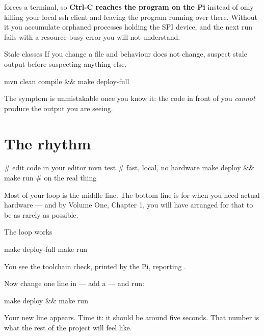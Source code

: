  forces a terminal, so \textbf{Ctrl-C reaches the program on the Pi}
instead of only killing your local ssh client and leaving the program running
over there. Without it you accumulate orphaned processes holding the SPI device,
and the next run fails with a resource-busy error you will not understand.

\begin{trap}{Stale classes}
If you change a file and behaviour does not change, suspect stale output before
suspecting anything else.

\begin{shell}
mvn clean compile && make deploy-full
\end{shell}

The symptom is unmistakable once you know it: the code in front of you
\emph{cannot} produce the output you are seeing.
\end{trap}

\section{The rhythm}

\begin{shell}
# edit code in your editor
mvn test                 # fast, local, no hardware
make deploy && make run  # on the real thing
\end{shell}

Most of your loop is the middle line. The bottom line is for when you need
actual hardware --- and by Volume One, Chapter 1, you will have arranged for that
to be as rarely as possible.

\begin{checkpoint}{The loop works}
\begin{shell}
make deploy-full
make run
\end{shell}

You see the toolchain check, printed by the Pi, reporting .

Now change one line in  --- add a
 --- and run:

\begin{shell}
make deploy && make run
\end{shell}

Your new line appears. Time it: it should be around five seconds. That number is
what the rest of the project will feel like.
\end{checkpoint}
